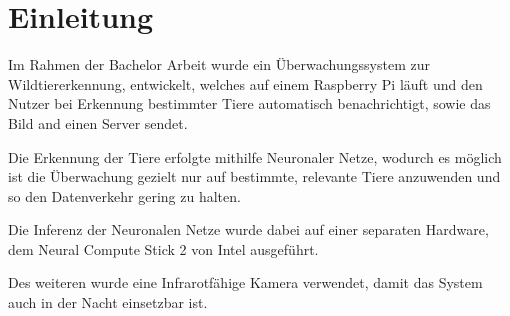 \chapter{Einleitung}\label{kap:einleitung}

Im Rahmen der Bachelor Arbeit wurde ein Überwachungssystem zur Wildtiererkennung,
entwickelt, welches auf einem Raspberry Pi läuft und den Nutzer bei Erkennung
bestimmter Tiere automatisch benachrichtigt, sowie das Bild and einen Server sendet.

Die Erkennung der Tiere erfolgte mithilfe Neuronaler Netze, wodurch es möglich ist 
die Überwachung gezielt nur auf bestimmte, relevante Tiere anzuwenden und so den
Datenverkehr gering zu halten. 

Die Inferenz der Neuronalen Netze wurde dabei auf einer separaten Hardware, dem 
Neural Compute Stick 2 von Intel ausgeführt.

Des weiteren wurde eine Infrarotfähige Kamera verwendet, damit das System auch
in der Nacht einsetzbar ist.
